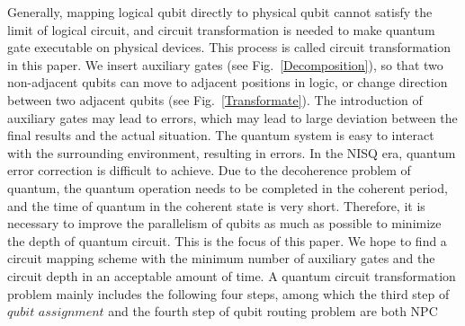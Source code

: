 \documentclass[runningheads]{llncs}
\begin{document}
Generally, mapping logical qubit directly to physical qubit cannot satisfy the limit of logical circuit, 
and circuit transformation is needed to make quantum gate executable on physical devices. 
This process is called circuit transformation in this paper. We insert 
auxiliary gates (see Fig.~\ref{Decomposition}),
so that two non-adjacent qubits can move to adjacent positions in logic, 
or change direction between two adjacent qubits (see Fig.~\ref{Transformate}). 
The introduction of auxiliary gates may lead to errors, 
which may lead to large deviation between the final results and the actual situation. 
The quantum system is easy to interact with the surrounding environment, 
resulting in errors. In the NISQ era, quantum error correction is difficult to achieve. 
Due to the decoherence problem of quantum, the quantum operation needs to be completed in the coherent period, 
and the time of quantum in the coherent state is very short. Therefore, 
it is necessary to improve the parallelism of qubits as much as possible to minimize the depth 
of quantum circuit. This is the focus of this paper. We hope to find a circuit mapping scheme 
with the minimum number of auxiliary gates and the circuit depth in an acceptable amount of time.
A quantum circuit transformation problem mainly includes the following four steps, 
among which the third step of $qubit$ $assignment$ and the fourth step of qubit routing 
problem are both NPC~\cite{2018QubitSiraichi}
\end{document}
